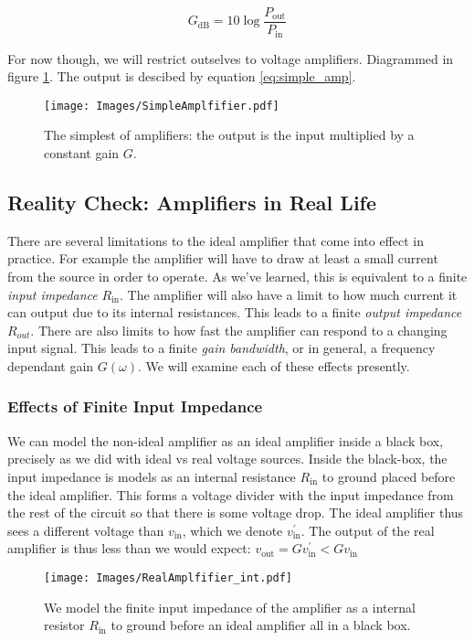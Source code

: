 \documentclass[]{article}
\begin{document}
\begin{equation}
\label{eq:power_amp_dB}
G_\text{dB} = 10\log\frac{P_\text{out}}{P_\text{in}} 
\end{equation}

\noindent For now though, we will restrict outselves to voltage amplifiers. Diagrammed in figure \ref{fig:simple_amp}. The output is descibed by equation \ref{eq:simple_amp}.

\begin{figure}[h]
\caption{The simplest of amplifiers: the output is the input multiplied by a constant gain $G$.}
\label{fig:simple_amp}
\begin{center}
\texttt{[image: Images/SimpleAmplfifier.pdf]}
\end{center}
\end{figure}

\subsection{Reality Check: Amplifiers in Real Life}
There are several limitations to the ideal amplifier that come into effect in practice. For example the amplifier will have to draw at least a small current from the source in order to operate. As we've learned, this is equivalent to a finite \textit{input impedance} $R_\text{in}$. The amplifier will also have a limit to how much current it can output due to its internal resistances. This leads to a finite \textit{output impedance} $R_{out}$. There are also limits to how fast the amplifier can respond to a changing input signal. This leads to a finite \textit{gain bandwidth}, or in general, a frequency dependant gain $G(\omega)$. We will examine each of these effects presently.

\subsubsection{Effects of Finite Input Impedance}
We can model the non-ideal amplifier as an ideal amplifier inside a black box, precisely as we did with ideal vs real voltage sources. Inside the black-box, the input impedance is models as an internal resistance $R_\text{in}$ to ground placed before the ideal amplifier. This forms a voltage divider with the input impedance from the rest of the circuit so that there is some voltage drop. The ideal amplifier thus sees a different voltage than $v_\text{in}$, which we denote $v^\prime_\text{in}$. The output of the real amplifier is thus less than we would expect: $v_\text{out} = Gv^\prime_\text{in} < Gv_\text{in}$
\begin{figure}[h]
\caption{We model the finite input impedance of the amplifier as a internal resistor $R_\text{in}$ to ground before an ideal amplifier all in a black box.}
\label{fig:real_amp_int}
\begin{center}
\texttt{[image: Images/RealAmplfifier\_int.pdf]}
\end{center}
\end{figure}
\end{document}
